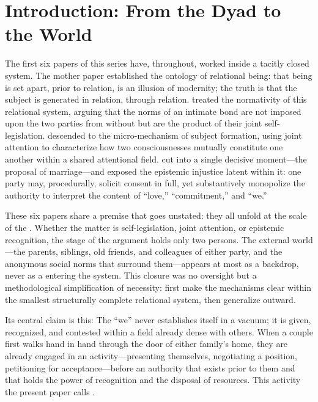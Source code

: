 
\section{Introduction: From the Dyad to the World}

The first six papers of this series have, throughout, worked inside a tacitly closed system. The mother paper established the ontology of relational being: that being is set apart, prior to relation, is an illusion of modernity; the truth is that the subject is generated in relation, through relation.  treated the normativity of this relational system, arguing that the norms of an intimate bond are not imposed upon the two parties from without but are the product of their joint self-legislation.  descended to the micro-mechanism of subject formation, using joint attention to characterize how two consciousnesses mutually constitute one another within a shared attentional field.  cut into a single decisive moment---the proposal of marriage---and exposed the epistemic injustice latent within it: one party may, procedurally, solicit consent in full, yet substantively monopolize the authority to interpret the content of ``love,'' ``commitment,'' and ``we.''

These six papers share a premise that goes unstated: they all unfold at the scale of the . Whether the matter is self-legislation, joint attention, or epistemic recognition, the stage of the argument holds only two persons. The external world---the parents, siblings, old friends, and colleagues of either party, and the anonymous social norms that surround them---appears at most as a backdrop, never as a  entering the system. This closure was no oversight but a methodological simplification of necessity: first make the mechanisms clear within the smallest structurally complete relational system, then generalize outward.

 Its central claim is this:  The ``we'' never establishes itself in a vacuum; it is given, recognized, and contested within a field already dense with others. When a couple first walks hand in hand through the door of either family's home, they are already engaged in an activity---presenting themselves, negotiating a position, petitioning for acceptance---before an authority that exists prior to them and that holds the power of recognition and the disposal of resources. This activity the present paper calls .

